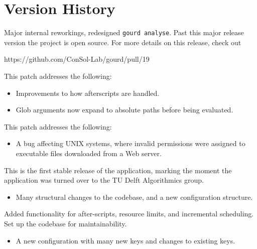 \pagebreak

\section{Version History}




Major internal reworkings, redesigned \texttt{gourd analyse}.
Past this major release version the project is open source.
For more details on this release, check out 

https://github.com/ConSol-Lab/gourd/pull/19


This patch addresses the following:
\begin{itemize}
\item Improvements to how afterscripts are handled.
\item Glob arguments now expand to absolute paths
      before being evaluated.
\end{itemize}


This patch addresses the following:
\begin{itemize}
\item A bug affecting UNIX systems, where invalid
      permissions were assigned to executable files
      downloaded from a Web server.
\end{itemize}


This is the first stable release of the application,
marking the moment the application was turned over
to the TU Delft Algorithmics group.

\breakingchanges
\begin{itemize}
\item Many structural changes to the codebase, and a
  new configuration structure.
\end{itemize}


Added functionality for after-scripts, resource limits,
and incremental scheduling.
Set up the codebase for maintainability.

\breakingchanges
\begin{itemize}
\item A new configuration with many new keys and
changes to existing keys.
\end{itemize}

